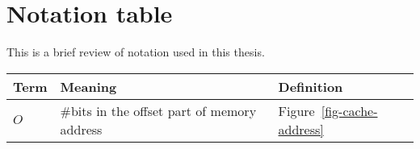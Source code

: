 \chapter*{Notation table}

This is a brief review of notation used in this thesis.

\begin{table}[h]
\centering\begin{tabular}{|l|l|l|}
    \hline
    \textbf{Term} & \textbf{Meaning} & \textbf{Definition} \\ \hline
    $O$& \#bits in the offset part of memory address & Figure~\ref{fig-cache-address} \\
    \hline
\end{tabular}
\label{table-notation}
\end{table}
